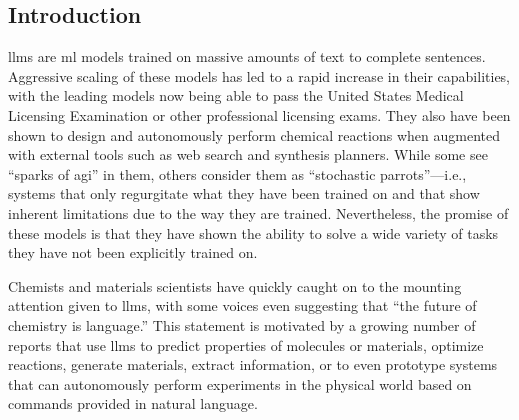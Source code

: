 \documentclass[11pt, oneside]{article}
\begin{document}
\clearpage
\begin{refsegment}
\section{Introduction}
\Glspl{llm} are \gls{ml} models trained on massive amounts of text to complete sentences.
Aggressive scaling of these models has led to a rapid increase in their capabilities,\autocite{brown2020language,zhong2024benchmarking} with the leading models now being able to pass the United States Medical Licensing Examination\autocite{kung2023performance} or other professional licensing exams.
They also have been shown to design and autonomously perform chemical reactions when augmented with external tools such as web search and synthesis planners.\autocite{openai2024gpt4, Boiko_2023, bran2023chemcrow, darvish2024organa}
While some see \enquote{sparks of \gls{agi}} in them,\autocite{bubeck2023sparks} others consider them as \enquote{stochastic parrots}---i.e., systems that only regurgitate what they have been trained on\autocite{bender2021dangers} and that show inherent limitations due to the way they are trained.\autocite{mccoy2023embersautoregressionunderstandinglarge}
Nevertheless, the promise of these models is that they have shown the ability to solve a wide variety of tasks they have not been explicitly trained on.\autocite{bommasani2021opportunities, anderljung2023frontier, ai4science2023impact}

Chemists and materials scientists have quickly caught on to the mounting attention given to \glspl{llm}, with some voices even suggesting that \enquote{the future of chemistry is language.}\autocite{White_2023}
This statement is motivated by a growing number of reports that use \glspl{llm} to predict properties of molecules or materials,\autocite{jablonka202314, jablonka2024leveraging, xie2024fine, liao2024words, zhang2024chemllm, zhong2024benchmarking}  optimize reactions,\autocite{ramos2023bayesian, kristiadi2024sober}  generate materials,\autocite{rubungo2023llm, flam2023language, gruver2024fine, alampara2024mattextlanguagemodelsneed} extract information,\autocite{Patiny_2023, Dagdelen_2024, Zheng_2024, lala2023paperqa, caufield2023structured, gupta2022discomat, schillingwilhelmi2024textinsightlargelanguage, skarlinski2024language} or to even prototype systems that can autonomously perform experiments in the physical world based on commands provided in natural language.\autocite{bran2023chemcrow, Boiko_2023, darvish2024organa}


\end{refsegment}
\end{document}
